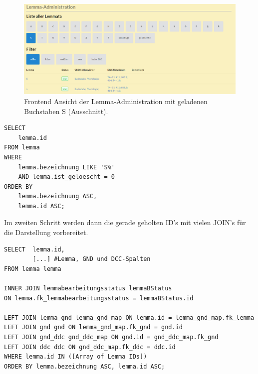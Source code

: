 \begin{figure}
	\centering
	\includegraphics[width=1\linewidth]{images/lemmaadministration_sample.PNG}
	\caption{Frontend Ansicht der Lemma-Administration mit geladenen Buchstaben S (Ausschnitt).}
	\label{img:lAdminSample}
\end{figure}

\lstset{language=SQL}
\begin{lstlisting}[frame=single] 
    SELECT
    lemma.id
FROM lemma
WHERE
    lemma.bezeichnung LIKE 'S%'
    AND lemma.ist_geloescht = 0
ORDER BY
    lemma.bezeichnung ASC,
    lemma.id ASC;
\end{lstlisting}

Im zweiten Schritt werden dann die gerade geholten ID’s mit vielen JOIN’s für die Darstellung vorbereitet.

\lstset{language=SQL}
\begin{lstlisting}[frame=single] 
SELECT  lemma.id,                        
        [...] #Lemma, GND und DCC-Spalten        
FROM lemma lemma
      
INNER JOIN lemmabearbeitungsstatus lemmaBStatus
ON lemma.fk_lemmabearbeitungsstatus = lemmaBStatus.id

LEFT JOIN lemma_gnd lemma_gnd_map ON lemma.id = lemma_gnd_map.fk_lemma
LEFT JOIN gnd gnd ON lemma_gnd_map.fk_gnd = gnd.id
LEFT JOIN gnd_ddc gnd_ddc_map ON gnd.id = gnd_ddc_map.fk_gnd
LEFT JOIN ddc ddc ON gnd_ddc_map.fk_ddc = ddc.id
WHERE lemma.id IN ([Array of Lemma IDs])
ORDER BY lemma.bezeichnung ASC, lemma.id ASC;

\end{lstlisting}
